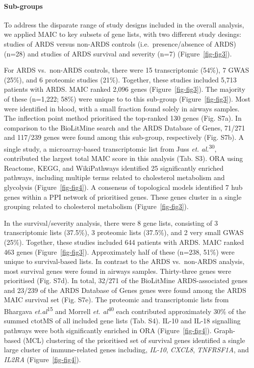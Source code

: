 \documentclass[
  11,
  a4paper,
]{article}
\let\oldparagraph\paragraph
\renewcommand{\paragraph}[1]{\oldparagraph{#1}\mbox{}}
\begin{document}
\paragraph{Sub-groups}\label{sub-groups}

To address the disparate range of study designs included in the overall
analysis, we applied MAIC to key subsets of gene lists, with two
different study desings: studies of ARDS versus non-ARDS controls
(i.e.~presence/absence of ARDS) (n=28) and studies of ARDS survival and
severity (n=7) (Figure~\ref{fig-fig3}).

For ARDS vs.~non-ARDS controls, there were 15 transcriptomic (54\%), 7
GWAS (25\%), and 6 proteomic studies (21\%). Together, these studies
included 5,713 patients with ARDS. MAIC ranked 2,096 genes
(Figure~\ref{fig-fig3}). The majority of these (n=1,222; 58\%) were
unique to to this sub-group (Figure~\ref{fig-fig3}). Most were
identified in blood, with a small fraction found solely in airways
samples. The inflection point method prioritised the top-ranked 130
genes (Fig. S7a). In comparison to the BioLitMine search and the ARDS
Database of Genes, 71/271 and 117/239 genes were found among this
sub-group, respectively (Fig. S7b). A single study, a microarray-based
transcriptomic list from Juss \emph{et. al.}\textsuperscript{30},
contributed the largest total MAIC score in this analysis (Tab. S3). ORA
using Reactome, KEGG, and WikiPathways identified 25 significantly
enriched pathways, including multiple terms related to cholesterol
metabolism and glycolysis (Figure~\ref{fig-fig4}). A consensus of
topological models identified 7 hub genes within a PPI network of
prioritised genes. These genes cluster in a single grouping related to
cholesterol metabolism (Figure~\ref{fig-fig3}).

In the survival/severity analysis, there were 8 gene lists, consisting
of 3 transcriptomic lists (37.5\%), 3 proteomic lists (37.5\%), and 2
very small GWAS (25\%). Together, these studies included 644 patients
with ARDS. MAIC ranked 463 genes (Figure~\ref{fig-fig3}). Approximately
half of these (n=238, 51\%) were unique to survival-based lists. In
contrast to the ARDS vs.~non-ARDS analysis, most survival genes were
found in airways samples. Thirty-three genes were prioritised (Fig.
S7d). In total, 32/271 of the BioLitMine ARDS-associated genes and
23/239 of the ARDS Database of Genes genes were found among the ARDS
MAIC survival set (Fig. S7e). The proteomic and transcriptomic lists
from Bhargava \emph{et.al}\textsuperscript{15} and Morrell \emph{et.
al}\textsuperscript{40} each contributed approximately 30\% of the
summed ctotMS of all included gene lists (Tab. S4). IL-10 and IL-18
signalling pathways were both significantly enriched in ORA
(Figure~\ref{fig-fig4}). Graph-based (MCL) clustering of the prioritised
set of survival genes identified a single large cluster of
immune-related genes including, \emph{IL-10}, \emph{CXCL8},
\emph{TNFRSF1A}, and \emph{IL2RA} (Figure~\ref{fig-fig4}).
\end{document}
